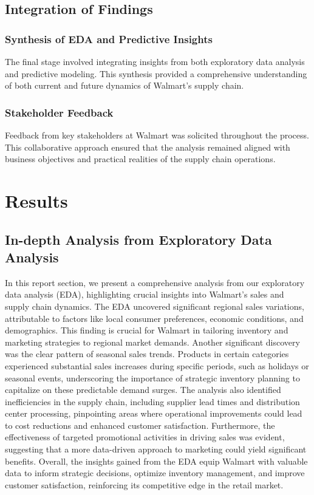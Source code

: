 \documentclass[conference]{IEEEtran}
\begin{document}
\subsection{Integration of Findings}

\subsubsection{Synthesis of EDA and Predictive Insights}
The final stage involved integrating insights from both exploratory data analysis and predictive modeling. This synthesis provided a comprehensive understanding of both current and future dynamics of Walmart's supply chain.

\subsubsection{Stakeholder Feedback}
Feedback from key stakeholders at Walmart was solicited throughout the process. This collaborative approach ensured that the analysis remained aligned with business objectives and practical realities of the supply chain operations.

\section{Results}
\subsection{In-depth Analysis from Exploratory Data Analysis}
In this report section, we present a comprehensive analysis from our exploratory data analysis (EDA), highlighting crucial insights into Walmart's sales and supply chain dynamics. The EDA uncovered significant regional sales variations, attributable to factors like local consumer preferences, economic conditions, and demographics. This finding is crucial for Walmart in tailoring inventory and marketing strategies to regional market demands. Another significant discovery was the clear pattern of seasonal sales trends. Products in certain categories experienced substantial sales increases during specific periods, such as holidays or seasonal events, underscoring the importance of strategic inventory planning to capitalize on these predictable demand surges. The analysis also identified inefficiencies in the supply chain, including supplier lead times and distribution center processing, pinpointing areas where operational improvements could lead to cost reductions and enhanced customer satisfaction. Furthermore, the effectiveness of targeted promotional activities in driving sales was evident, suggesting that a more data-driven approach to marketing could yield significant benefits. Overall, the insights gained from the EDA equip Walmart with valuable data to inform strategic decisions, optimize inventory management, and improve customer satisfaction, reinforcing its competitive edge in the retail market.
\end{document}
